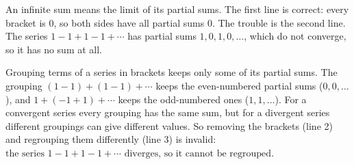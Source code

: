 An infinite sum means the limit of its partial sums. The first line is correct: every bracket is $0$, so both sides have all partial sums $0$. The trouble is the second line. The series $1-1+1-1+\cdots$ has partial sums $1,0,1,0,\dots$, which do not converge, so it has no sum at all.

Grouping terms of a series in brackets keeps only some of its partial sums. The grouping $(1-1)+(1-1)+\cdots$ keeps the even-numbered partial sums ($0,0,\dots$), and $1+(-1+1)+\cdots$ keeps the odd-numbered ones ($1,1,\dots$). For a convergent series every grouping has the same sum, but for a divergent series different groupings can give different values. So removing the brackets (line 2) and regrouping them differently (line 3) is invalid: $\boxed{\text{the series }1-1+1-1+\cdots\text{ diverges, so it cannot be regrouped}}$.
